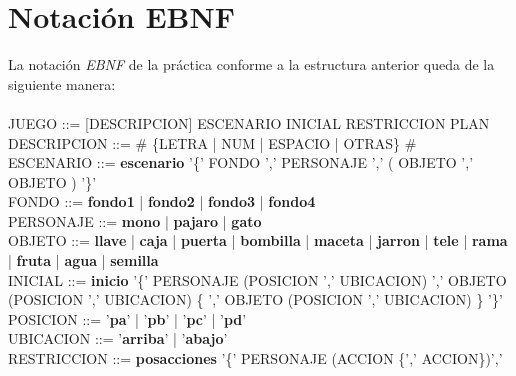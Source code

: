 \documentclass[11pt,a4paper,spanish,twoside]{book}
\theoremstyle{plain} \newtheorem{nota}{Nota}
\begin{document}
\chapter{Notación EBNF}
La notación \emph{EBNF} de la práctica conforme a la estructura anterior queda 
de la siguiente manera:
\\ 
\\
JUEGO ::= [DESCRIPCION] ESCENARIO INICIAL RESTRICCION PLAN
\\
DESCRIPCION ::= \# \{LETRA | NUM | ESPACIO | OTRAS\} \#
\\
ESCENARIO ::= \textbf{escenario} '\{' FONDO ',' PERSONAJE ',' ( OBJETO { ',' 
OBJETO} ) '\}'
\\
FONDO ::= \textbf{fondo1} | \textbf{fondo2} | \textbf{fondo3} | \textbf{fondo4}
\\
PERSONAJE ::= \textbf{mono} | \textbf{pajaro} | \textbf{gato} 
\\
OBJETO ::= \textbf{llave} | \textbf{caja} | \textbf{puerta} | \textbf{bombilla}
 | \textbf{maceta} | \textbf{jarron} | \textbf{tele} | \textbf{rama} | 
\textbf{fruta} | \textbf{agua} | \textbf{semilla} 
\\
INICIAL ::= \textbf{inicio} '\{' PERSONAJE (POSICION ',' UBICACION) ',' OBJETO 
(POSICION ',' UBICACION) \{ ',' OBJETO (POSICION ',' UBICACION) \} '\}'
\\
POSICION ::= '\textbf{pa}' | '\textbf{pb}' | '\textbf{pc}' | '\textbf{pd}'
\\
UBICACION ::= '\textbf{arriba}' | '\textbf{abajo}'
\\
RESTRICCION ::= \textbf{posacciones} '\{' PERSONAJE (ACCION \{',' ACCION\})',' 
\end{document}

